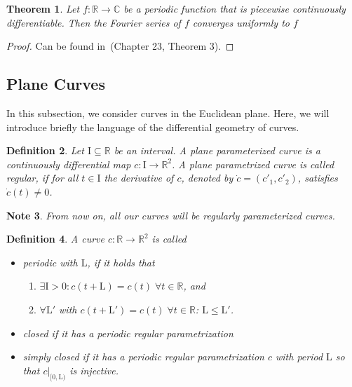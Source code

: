\documentclass[a4paper]{book}
\newtheorem{theorem}{Theorem}%
\newtheorem{note}[theorem]{Note}%
\newtheorem{definition}[theorem]{Definition}%
\numberwithin{theorem}{section}%
\begin{document}
\begin{theorem}
    Let $f:\mathbb{R}\to\mathbb{C}$ be a periodic function that is piecewise continuously differentiable. Then the Fourier series of $f$ converges uniformly to $f$
\end{theorem}
\begin{proof}
    Can be found in~\citep{forster2011analysis}(Chapter 23, Theorem 3).
\end{proof}

\subsection{Plane Curves}
In this subsection, we consider curves in the Euclidean plane. Here, we will introduce briefly the language of the differential geometry of curves.

\begin{definition}
    Let $\mathrm{I}\subseteq\mathbb{R}$ be an interval. A \textit{plane parameterized curve} is a continuously differential map $c:\mathrm{I}\to\mathbb{R}^{2}$. A plane parametrized curve is called \textit{regular}, if for all $t\in\mathrm{I}$ the derivative of $c$, denoted by $\dot{c}=(c'_{1},c'_{2})$, satisfies $\dot{c}(t)\neq0$.
\end{definition} 

\begin{note}
    From now on, all our curves will be regularly parameterized curves.
\end{note}

\begin{definition}
    A curve $c:\mathbb{R}\to\mathbb{R}^{2}$ is called
    \begin{itemize}
        \item periodic with $\mathrm{L}$, if it holds that
        \begin{enumerate}
            \item $\exists\mathrm{I}>0: c(t+\mathrm{L})=c(t)\;\forall t\in\mathbb{R}$, and
            \item $\forall\mathrm{L}'$ with $c(t+\mathrm{L}')=c(t)\;\forall t\in\mathbb{R}$: $\mathrm{L}\leq\mathrm{L}'$.
        \end{enumerate}
        \item closed if it has a periodic regular parametrization
        \item simply closed if it has a periodic regular parametrization $c$ with period $\mathrm{L}$ so that $c|_{[0,\mathrm{L})}$ is injective.
    \end{itemize}
\end{definition}
\end{document}
